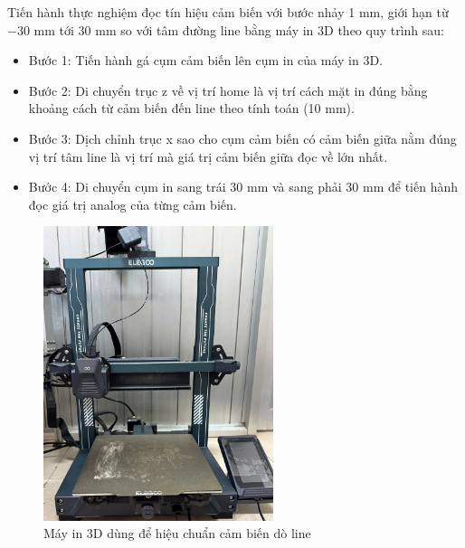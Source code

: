             Tiến hành thực nghiệm đọc tín hiệu cảm biến với bước nhảy 1 mm, giới hạn từ $-30$ mm tới $30$ mm so với tâm đường line bằng máy in 3D theo quy trình sau:
            \begin{itemize}
                \item Bước 1: Tiến hành gá cụm cảm biến lên cụm in của máy in 3D.
                \item Bước 2: Di chuyển trục z về vị trí home là vị trí cách mặt in đúng bằng khoảng cách từ cảm biến đến line theo tính toán (10 mm).
                \item Bước 3: Dịch chỉnh trục x sao cho cụm cảm biến có cảm biến giữa nằm đúng vị trí tâm line là vị trí mà giá trị cảm biến giữa đọc về lớn nhất.
                \item Bước 4: Di chuyển cụm in sang trái 30 mm và sang phải 30 mm để tiến hành đọc giá trị analog của từng cảm biến.
            \end{itemize}
            \begin{figure}[H]
                \centering
                \includegraphics[width=0.6\textwidth]{pictures/chapter4/c4_p16_3DPrinter.png}
                \caption{Máy in 3D dùng để hiệu chuẩn cảm biến dò line}
                \label{fig:4-17}
            \end{figure}
        
